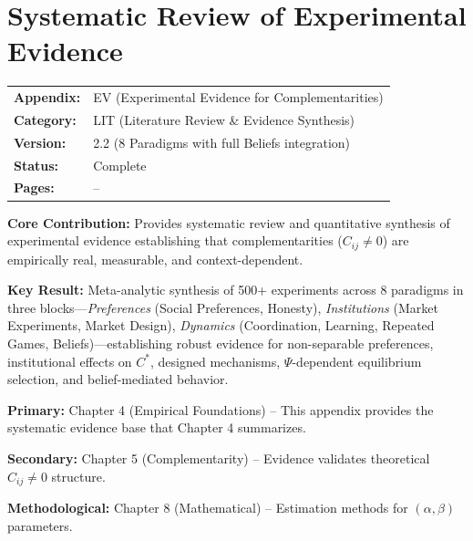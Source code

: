 \section{Systematic Review of Experimental Evidence}
\label{app:experimental-evidence}


\begin{tcolorbox}[colback=blue!5!white, colframe=blue!75!black,
    title=\textbf{Appendix UNMAPPED_EXP: LIT-EVIDENCE}]

\begin{tabular}{@{}ll@{}}
\textbf{Appendix:} & EV (Experimental Evidence for Complementarities) \\
\textbf{Category:} & LIT (Literature Review \& Evidence Synthesis) \\
\textbf{Version:} & 2.2 (8 Paradigms with full Beliefs integration) \\
\textbf{Status:} & Complete \\
\textbf{Pages:} & \pageref{app:experimental-evidence}--\pageref{sec:EV-footer} \\
\end{tabular}

\tcblower

\textbf{Core Contribution:} Provides systematic review and quantitative synthesis
of experimental evidence establishing that complementarities ($C_{ij} \neq 0$)
are empirically real, measurable, and context-dependent.

\textbf{Key Result:} Meta-analytic synthesis of 500+ experiments across 8
paradigms in three blocks---\emph{Preferences} (Social Preferences, Honesty),
\emph{Institutions} (Market Experiments, Market Design), \emph{Dynamics}
(Coordination, Learning, Repeated Games, Beliefs)---establishing robust evidence for
non-separable preferences, institutional effects on $C^*$, designed mechanisms,
$\Psi$-dependent equilibrium selection, and belief-mediated behavior.

\end{tcolorbox}


\begin{tcolorbox}[colback=gray!10!white, colframe=gray!75!black,
    title=\textbf{Chapter Linkage}]

\textbf{Primary:} Chapter 4 (Empirical Foundations) -- This appendix provides
the systematic evidence base that Chapter 4 summarizes.

\textbf{Secondary:} Chapter 5 (Complementarity) -- Evidence validates theoretical
$C_{ij} \neq 0$ structure.

\textbf{Methodological:} Chapter 8 (Mathematical) -- Estimation methods for
$(\alpha, \beta)$ parameters.

\end{tcolorbox}

